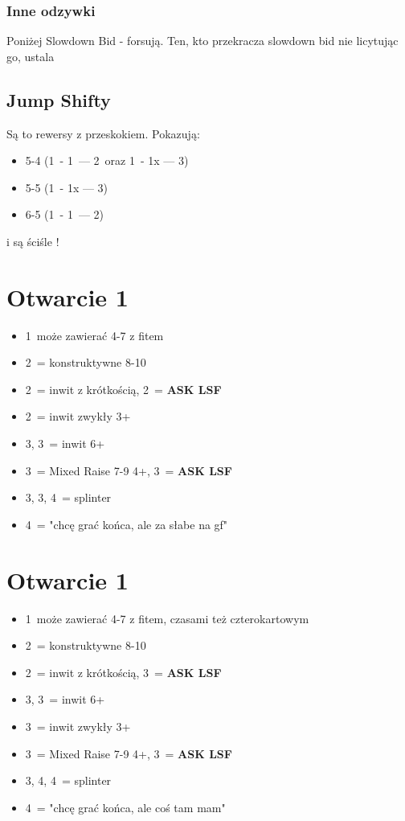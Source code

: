 \documentclass[12pt, a4paper]{article}
\newcommand{\lsf}{\color{WildStrawberry}\textbf{ASK LSF}\color{black}}
\newcommand*\link[1]{\hspace*{0em plus 1fill}\makebox{#1}}
\newcommand{\imp}{\color{BurntOrange}\link{\textbf{\large!}}\color{black}}
\begin{document}
\subsubsection*{Inne odzywki}
Poniżej Slowdown Bid - forsują. Ten, kto przekracza slowdown bid nie licytując go, ustala \gf

\subsection*{Jump Shifty}
Są to rewersy z przeskokiem. Pokazują:
\begin{itemize}
    \item 5-4 (1\minor\ - 1\hearts\ --- 2\spades\ oraz 1\diams\ - 1x --- 3\clubs)
    \item 5-5 (1\major\ - 1x --- 3\minor)
    \item 6-5 (1\hearts\ - 1\nt\ --- 2\spades) \imp
\end{itemize} 
i są ściśle \gf!



\pagebreak
\section{Otwarcie 1\hearts}
\begin{itemize}
    \item 1\nt\ może zawierać 4-7 z fitem
    \item 2\hearts\ = konstruktywne 8-10
    \item 2\spades\ = inwit z krótkością, 2\nt\ = \lsf
    \item 2\nt\ = inwit zwykły 3+\hearts
    \item 3\clubs, 3\diams\ = inwit 6+\minor
    \item 3\hearts\ = Mixed Raise 7-9 4+\hearts, 3\spades\ = \lsf
    \item 3\spades, 3\nt, 4\clubs\ = splinter
    \item 4\diams\ = "chcę grać końca, ale za słabe na gf"
\end{itemize}

\section{Otwarcie 1\spades}
\begin{itemize}
    \item 1\nt\ może zawierać 4-7 z fitem, czasami też czterokartowym
    \item 2\spades\ = konstruktywne 8-10
    \item 2\nt\ = inwit z krótkością, 3\clubs\ = \lsf
    \item 3\clubs, 3\diams\ = inwit 6+\minor
    \item 3\hearts\ = inwit zwykły 3+\spades
    \item 3\spades\ = Mixed Raise 7-9 4+\spades, 3\nt\ = \lsf
    \item 3\nt, 4\clubs, 4\diams\ = splinter
    \item 4\hearts\ = "chcę grać końca, ale coś tam mam"
\end{itemize}
\end{document}
